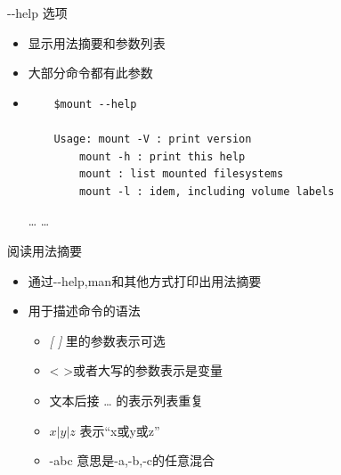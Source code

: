 \begin{frame}[fragile]{-{}-help 选项}
\begin{itemize}
\item 显示用法摘要和参数列表
\item 大部分命令都有此参数
\item  
	\begin{verbatim}
	$mount --help
	
	Usage: mount -V : print version
		mount -h : print this help
		mount : list mounted filesystems	
		mount -l : idem, including volume labels
	\end{verbatim}
	\ldots{} \ldots{}

\end{itemize}
\end{frame}

\begin{frame}{阅读用法摘要}
\begin{itemize}
\item 通过-{}-help,man和其他方式打印出用法摘要
\item 用于描述命令的语法
	\begin{itemize}
		\item \emph{[ {} ]} 里的参数表示可选
		\item {<} {>}或者大写的参数表示是变量
		\item 文本后接 \ldots{} 的表示列表重复
		\item $x | y | z$ 表示“x或y或z”
		\item -abc 意思是-a,-b,-c的任意混合
	\end{itemize}
\end{itemize}
\end{frame}
